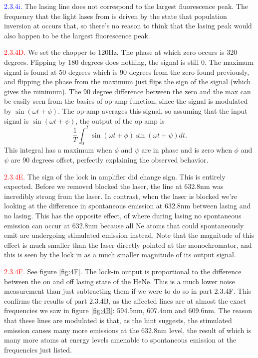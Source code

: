 \documentclass[letterpaper, reqno,11pt]{article}
\begin{document}
\noindent \textcolor{blue}{2.3.4i.} The lasing line does not correspond to the largest fluorescence peak. The frequency that the light lases from is driven by the state that population inversion at occurs that, so there's no reason to think that the lasing peak would also happen to be the largest fluorescence peak.

\noindent \textcolor{red}{2.3.4D.} We set the chopper to 120Hz. The phase at which zero occurs is 320 degrees. Flipping by 180 degrees does nothing, the signal is still 0. The maximum signal is found at 50 degrees which is 90 degrees from the zero found previously, and flipping the phase from the maximum just flips the sign of the signal (which gives the minimum). The 90 degree difference between the zero and the max can be easily seen from the basics of op-amp function, since the signal is modulated by $\sin(\omega t+\phi)$. The op-amp averages this signal, so assuming that the input signal is $\sin(\omega t+\psi)$, the output of the op amp is
\[
\frac{1}{T}\int_{0}^{T}\sin(\omega t+\phi)\sin(\omega t+\psi)dt
.\]
This integral has a maximum when $\phi$ and $\psi$ are in phase and is zero when $\phi$ and $\psi$ are 90 degrees offset, perfectly explaining the observed behavior.

\noindent \textcolor{red}{2.3.4E.} The sign of the lock in amplifier did change sign. This is entirely expected. Before we removed blocked the laser, the line at 632.8nm was incredibly strong from the laser. In contrast, when the laser is blocked we're looking at the difference in spontaneous emission at 632.8nm between lasing and no lasing. This has the opposite effect, of where during lasing no spontaneous emission can occur at 632.8nm because all Ne atoms that could spontaneously emit are undergoing stimulated emission instead. Note that the magnitude of this effect is much smaller than the laser directly pointed at the monochromator, and this is seen by the lock in as a much smaller magnitude of its output signal.

\noindent \textcolor{red}{2.3.4F.} See figure \ref{fig:4F}. The lock-in output is proportional to the difference between the on and off lasing state of the HeNe. This is a much lower noise measurement than just subtracting them if we were to do so in part 2.3.4F. This confirms the results of part 2.3.4B, as the affected lines are at almost the exact frequencies we saw in figure \ref{fig:4B}: 594.5nm, 607.4nm and 609.6nm. The reason that these lines are modulated is that, as the hint suggests, the stimulated emission causes many more emissions at the 632.8nm level, the result of which is many more atoms at energy levels amenable to spontaneous emission at the frequencies just listed.
\end{document}

